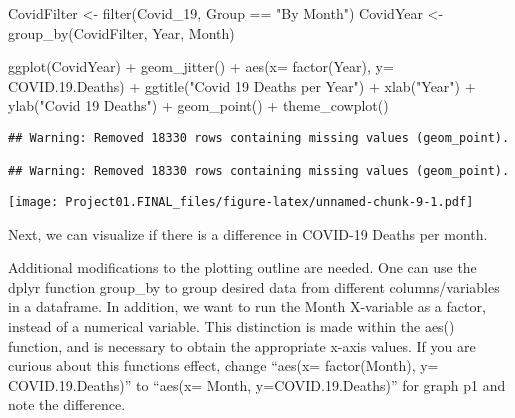 \documentclass[
]{article}
\newenvironment{Shaded}{\begin{snugshade}}{\end{snugshade}}
\newcommand{\AttributeTok}[1]{\textcolor[rgb]{0.77,0.63,0.00}{#1}}
\newcommand{\FloatTok}[1]{\textcolor[rgb]{0.00,0.00,0.81}{#1}}
\newcommand{\FunctionTok}[1]{\textcolor[rgb]{0.00,0.00,0.00}{#1}}
\newcommand{\NormalTok}[1]{#1}
\newcommand{\OtherTok}[1]{\textcolor[rgb]{0.56,0.35,0.01}{#1}}
\newcommand{\SpecialCharTok}[1]{\textcolor[rgb]{0.00,0.00,0.00}{#1}}
\newcommand{\StringTok}[1]{\textcolor[rgb]{0.31,0.60,0.02}{#1}}
\begin{document}
\begin{Shaded}
\begin{Highlighting}[]
\NormalTok{CovidFilter }\OtherTok{\textless{}{-}} \FunctionTok{filter}\NormalTok{(Covid\_19, Group }\SpecialCharTok{==} \StringTok{"By Month"}\NormalTok{)}
\NormalTok{CovidYear }\OtherTok{\textless{}{-}} \FunctionTok{group\_by}\NormalTok{(CovidFilter, Year, Month)}

\FunctionTok{ggplot}\NormalTok{(CovidYear) }\SpecialCharTok{+}
  \FunctionTok{geom\_jitter}\NormalTok{() }\SpecialCharTok{+} 
  \FunctionTok{aes}\NormalTok{(}\AttributeTok{x=} \FunctionTok{factor}\NormalTok{(Year), }\AttributeTok{y=}\NormalTok{ COVID.}\FloatTok{19.}\NormalTok{Deaths) }\SpecialCharTok{+} 
    \FunctionTok{ggtitle}\NormalTok{(}\StringTok{"Covid 19 Deaths per Year"}\NormalTok{) }\SpecialCharTok{+} 
  \FunctionTok{xlab}\NormalTok{(}\StringTok{"Year"}\NormalTok{) }\SpecialCharTok{+} 
  \FunctionTok{ylab}\NormalTok{(}\StringTok{"Covid 19 Deaths"}\NormalTok{) }\SpecialCharTok{+} 
  \FunctionTok{geom\_point}\NormalTok{() }\SpecialCharTok{+} 
  \FunctionTok{theme\_cowplot}\NormalTok{()}
\end{Highlighting}
\end{Shaded}

\begin{verbatim}
## Warning: Removed 18330 rows containing missing values (geom_point).

## Warning: Removed 18330 rows containing missing values (geom_point).
\end{verbatim}

\texttt{[image: Project01.FINAL\_files/figure-latex/unnamed-chunk-9-1.pdf]}

Next, we can visualize if there is a difference in COVID-19 Deaths per
month.

Additional modifications to the plotting outline are needed. One can use
the dplyr function group\_by to group desired data from different
columns/variables in a dataframe. In addition, we want to run the Month
X-variable as a factor, instead of a numerical variable. This
distinction is made within the aes() function, and is necessary to
obtain the appropriate x-axis values. If you are curious about this
functions effect, change ``aes(x= factor(Month), y= COVID.19.Deaths)''
to ``aes(x= Month, y=COVID.19.Deaths)'' for graph p1 and note the
difference.
\end{document}
